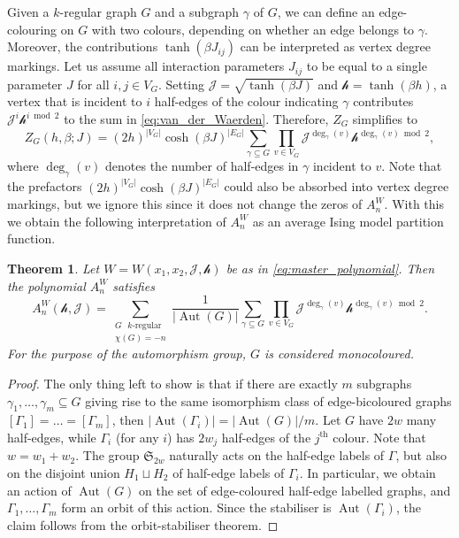 \documentclass[11pt, a4paper]{article}
\newtheorem{theorem}{Theorem}
\numberwithin{theorem}{section}
\theoremstyle{remark}
\DeclareMathOperator{\Aut}{Aut}
\newcommand{\J}{\mathcal{J}}
\newcommand{\h}{\mathcal{h}}
\newcommand{\Sym}{\mathfrak{S}}
\theoremstyle{theorem}
\begin{document}
Given a $k$-regular graph $G$ and a subgraph $\gamma$ of $G$, we can define an edge-colouring on $G$ with two colours, depending on whether an edge belongs to $\gamma$. Moreover, the contributions $\tanh(\beta J_{ij})$ can be interpreted as vertex degree markings. Let us assume all interaction parameters $J_{ij}$ to be equal to a single parameter $J$ for all $i,j\in V_G$. Setting $\J = \sqrt{\tanh(\beta J)}$ and $\h = \tanh(\beta h)$, a vertex that is incident to $i$ half-edges of the colour indicating $\gamma$ contributes $\J^i \h^{i \bmod 2}$ to the sum in \eqref{eq:van_der_Waerden}. Therefore, $Z_G$ simplifies to 
\[
  Z_G(h,\beta; J) = (2h)^{|V_G|} \cosh(\beta J)^{|E_G|} \sum_{\gamma\subseteq G} \prod_{v\in V_G} \J^{\deg_\gamma(v)}\h^{\deg_\gamma(v) \bmod 2},
\]
where $\deg_\gamma(v)$ denotes the number of half-edges in $\gamma$ incident to $v$. Note that the prefactors $(2h)^{|V_G|} \cosh(\beta J)^{|E_G|}$ could also be absorbed into vertex degree markings, but we ignore this since it does not change the zeros of $A_n^W$. With this we obtain the following interpretation of $A_n^{W}$ as an average Ising model partition function.

\begin{theorem}
  Let $W = W(x_1,x_2,\J,\h)$ be as in \eqref{eq:master_polynomial}. Then the polynomial $A_n^{W}$ satisfies
  \[
    A_n^{W}(\h,\J) = \sum_{\substack{G \text{ $k$-regular} \\ \chi(G) = -n}} \frac{1}{|\Aut(G)|} \sum_{\gamma\subseteq G} \prod_{v\in V_G} \J^{\deg_\gamma(v)}\h^{\deg_\gamma(v) \bmod 2}.
  \]
  For the purpose of the automorphism group, $G$ is considered monocoloured.
\end{theorem}

\begin{proof}
  The only thing left to show is that if there are exactly $m$ subgraphs $\gamma_1,\dots,\gamma_m \subseteq G$ giving rise to the same isomorphism class of edge-bicoloured graphs $[\Gamma_1]=\dots =[\Gamma_m]$, then $|\Aut(\Gamma_i)| = |\Aut(G)|/m$. 
  Let $G$ have $2w$ many half-edges, while $\Gamma_i$ (for any $i$) has $2w_j$ half-edges of the $j^{\text{th}}$ colour. Note that $w = w_1+ w_2$. The group $\Sym_{2w}$ naturally acts on the half-edge labels of $\Gamma$, but also on the disjoint union $H_1\sqcup H_2$ of half-edge labels of $\Gamma_i$. In particular, we obtain an action of $\Aut(G)$ on the set of edge-coloured half-edge labelled graphs, and $\Gamma_1,\dots,\Gamma_m$ form an orbit of this action. Since the stabiliser is $\Aut(\Gamma_i)$, the claim follows from the orbit-stabiliser theorem.
\end{proof}
\end{document}

